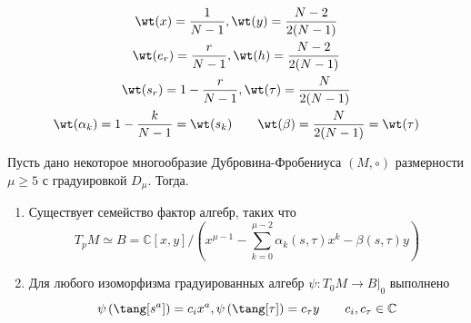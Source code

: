 \begin{equation}
	\begin{gathered}
		\wt(x)=\frac1{N-1}, \wt(y)=\frac{N-2}{2(N-1)}\\
		\wt(e_r)=\frac r{N-1}, \wt(h)=\frac{N-2}{2(N-1)}\\
		\wt(s_r)=1-\frac r{N-1}, \wt(\tau)=\frac{N}{2(N-1)}\\
		\wt(\alpha_k)=1-\frac{k}{N-1}=\wt(s_k) \qquad
		\wt(\beta) = \frac{N}{2(N-1)} = \wt(\tau)
	\end{gathered}
	\label{eq:weightDN}
\end{equation}
\begin{lem}
	Пусть дано некоторое многообразие Дубровина-Фробениуса \((M, \circ)\) размерности \(\mu \geq 5\) с градуировкой \(D_\mu\). Тогда.
	\begin{enumerate}
		\item Существует семейство фактор алгебр, таких что 
		\[T_pM \simeq B = \mathbb{C}[x, y]/\left(x^{\mu - 1}  - \sum_{k=0}^{\mu - 2}\alpha_k (s, \tau)  x^k - \beta(s, \tau) y \right)\]
		\item Для любого изоморфизма градуированных алгебр \(\psi : T_0M \to B|_0\) выполнено \[\psi\left(\tang[s^a]\right) = c_i x^a, \psi\left(\tang[\tau]\right) = c_\tau y \qquad c_i, c_\tau \in \mathbb{C}\]
	\end{enumerate}
\end{lem}